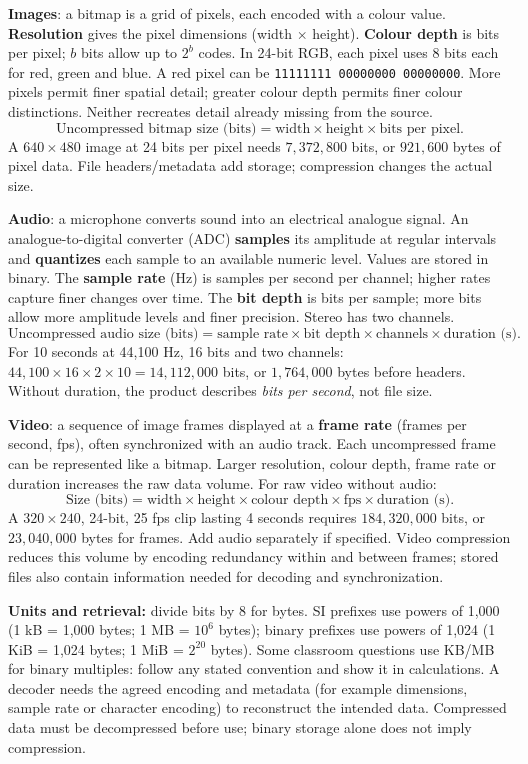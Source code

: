\documentclass[a4paper,12pt]{article}
\begin{document}
\textbf{Images}: a bitmap is a grid of pixels, each encoded with a colour value. \textbf{Resolution} gives the pixel dimensions (width $\times$ height). \textbf{Colour depth} is bits per pixel; $b$ bits allow up to $2^b$ codes. In 24-bit RGB, each pixel uses 8 bits each for red, green and blue. A red pixel can be \texttt{11111111 00000000 00000000}. More pixels permit finer spatial detail; greater colour depth permits finer colour distinctions. Neither recreates detail already missing from the source.
\[
\text{Uncompressed bitmap size (bits)}=\text{width}\times\text{height}\times\text{bits per pixel}.
\]
A $640\times480$ image at 24 bits per pixel needs $7{,}372{,}800$ bits, or $921{,}600$ bytes of pixel data. File headers/metadata add storage; compression changes the actual size.

\textbf{Audio}: a microphone converts sound into an electrical analogue signal. An analogue-to-digital converter (ADC) \textbf{samples} its amplitude at regular intervals and \textbf{quantizes} each sample to an available numeric level. Values are stored in binary. The \textbf{sample rate} (Hz) is samples per second per channel; higher rates capture finer changes over time. The \textbf{bit depth} is bits per sample; more bits allow more amplitude levels and finer precision. Stereo has two channels.
\[
\text{Uncompressed audio size (bits)}=\text{sample rate}\times\text{bit depth}\times\text{channels}\times\text{duration (s)}.
\]
For 10 seconds at 44,100 Hz, 16 bits and two channels: $44{,}100\times16\times2\times10=14{,}112{,}000$ bits, or $1{,}764{,}000$ bytes before headers. Without duration, the product describes \emph{bits per second}, not file size.

\textbf{Video}: a sequence of image frames displayed at a \textbf{frame rate} (frames per second, fps), often synchronized with an audio track. Each uncompressed frame can be represented like a bitmap. Larger resolution, colour depth, frame rate or duration increases the raw data volume. For raw video without audio:
\[
\text{Size (bits)}=\text{width}\times\text{height}\times\text{colour depth}\times\text{fps}\times\text{duration (s)}.
\]
A $320\times240$, 24-bit, 25 fps clip lasting 4 seconds requires $184{,}320{,}000$ bits, or $23{,}040{,}000$ bytes for frames. Add audio separately if specified. Video compression reduces this volume by encoding redundancy within and between frames; stored files also contain information needed for decoding and synchronization.

\textbf{Units and retrieval:} divide bits by 8 for bytes. SI prefixes use powers of 1,000 (1 kB = 1,000 bytes; 1 MB = $10^6$ bytes); binary prefixes use powers of 1,024 (1 KiB = 1,024 bytes; 1 MiB = $2^{20}$ bytes). Some classroom questions use KB/MB for binary multiples: follow any stated convention and show it in calculations. A decoder needs the agreed encoding and metadata (for example dimensions, sample rate or character encoding) to reconstruct the intended data. Compressed data must be decompressed before use; binary storage alone does not imply compression.
\end{document}
